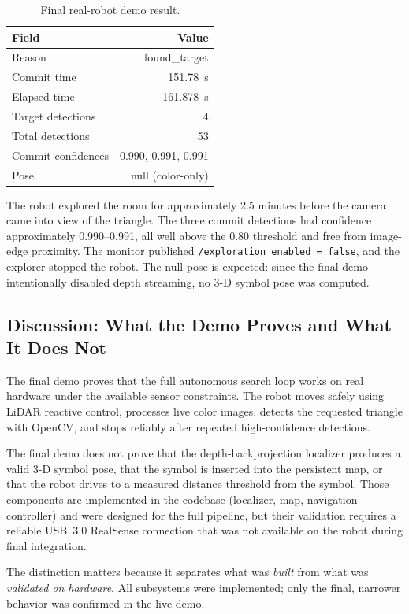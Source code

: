 \documentclass[letterpaper, 10 pt, conference]{ieeeconf/ieeeconf}
\begin{document}
\begin{table}[h]
\centering
\caption{Final real-robot demo result.}
\label{tab:result}
\begin{tabular}{lr}
\toprule
Field & Value \\
\midrule
Reason & found\_target \\
Commit time & 151.78~s \\
Elapsed time & 161.878~s \\
Target detections & 4 \\
Total detections & 53 \\
Commit confidences & 0.990, 0.991, 0.991 \\
Pose & null (color-only) \\
\bottomrule
\end{tabular}
\end{table}

The robot explored the room for approximately 2.5 minutes before the camera
came into view of the triangle.
The three commit detections had confidence approximately 0.990--0.991, all
well above the 0.80 threshold and free from image-edge proximity.
The monitor published \texttt{/exploration\_enabled = false}, and the
explorer stopped the robot.
The null pose is expected: since the final demo intentionally disabled depth
streaming, no 3-D symbol pose was computed.

\subsection{Discussion: What the Demo Proves and What It Does Not}

The final demo proves that the full autonomous search loop works on real
hardware under the available sensor constraints.
The robot moves safely using LiDAR reactive control, processes live color
images, detects the requested triangle with OpenCV, and stops reliably after
repeated high-confidence detections.

The final demo does not prove that the depth-backprojection localizer
produces a valid 3-D symbol pose, that the symbol is inserted into the
persistent map, or that the robot drives to a measured distance threshold
from the symbol.
Those components are implemented in the codebase (localizer, map, navigation
controller) and were designed for the full pipeline, but their validation
requires a reliable USB~3.0 RealSense connection that was not available on
the robot during final integration.

The distinction matters because it separates what was \emph{built} from what
was \emph{validated on hardware}.
All subsystems were implemented; only the final, narrower behavior was
confirmed in the live demo.
\end{document}
